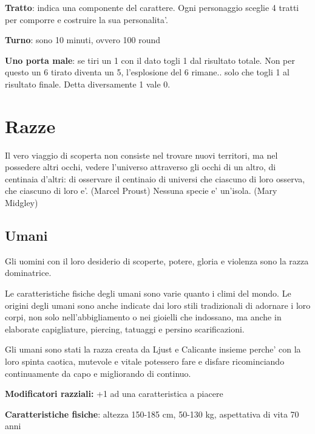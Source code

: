 \documentclass[a4paper,11pt,twoside,openany]{dndbook}
\begin{document}
\textbf{Tratto}: indica una componente del carattere. Ogni personaggio sceglie 4 tratti per comporre e costruire la sua personalita'.

\textbf{Turno}: sono 10 minuti, ovvero 100 round

\textbf{Uno porta male}: se tiri un 1 con il dato togli 1 dal risultato totale. Non per questo un 6 tirato diventa un 5, l’esplosione del 6 rimane.. solo che togli 1 al risultato finale. Detta diversamente 1 vale 0.

\pagebreak


\section{Razze}

\begin{quotebox}
Il vero viaggio di scoperta non consiste nel trovare nuovi territori, ma nel possedere altri occhi, vedere l'universo attraverso gli occhi di un altro, di centinaia d'altri: di osservare il centinaio di universi che ciascuno di loro osserva, che ciascuno di loro e'. (Marcel Proust)\linebreak
\linebreak
Nessuna specie e' un'isola. (Mary Midgley)
\end{quotebox}

\subsection{Umani}

Gli uomini con il loro desiderio di scoperte, potere, gloria e violenza sono la razza dominatrice.

Le caratteristiche fisiche degli umani sono varie quanto i climi del mondo. Le origini degli umani sono anche indicate dai loro stili tradizionali di adornare i loro corpi, non solo nell'abbigliamento o nei gioielli che indossano, ma anche in elaborate capigliature, piercing, tatuaggi e persino scarificazioni.

Gli umani sono stati la razza creata da Ljust e Calicante insieme perche' con la loro spinta caotica, mutevole e vitale potessero fare e disfare ricominciando continuamente da capo e migliorando di continuo.

\textbf{Modificatori razziali:} +1 ad una caratteristica a piacere

\textbf{Caratteristiche fisiche}: altezza 150-185 cm, 50-130 kg, aspettativa di vita 70 anni
\end{document}

